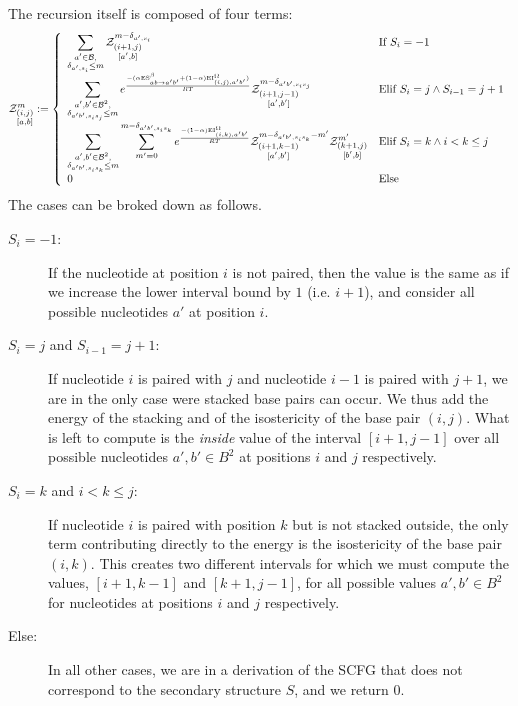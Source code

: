 The recursion itself is composed of four terms:
$$
	\Z{i,j}{m}{a,b}:=\left\{
  \begin{array}{ll}
  		\displaystyle
      \sum_{\substack{a'\in \B,\\ \Kron_{a',s_i}\le m}}  
      \Z{i+1,j}{m-\Kron_{a',s_i}}{a',b} & \text{If }S_{i}=-1\\
      \displaystyle
      \sum_{\substack{a',b'\in \B^2,\\ \Kron_{a'b',s_is_j}\le m}}
			 e^{\frac{-(\alpha \text{ES}^\beta_{a b \to a' b'}+(1-\alpha)\text{EI}^{\Omega}_{(i,j),a'b'})}{RT}}
			 \Z{i+1,j-1}{m-\Kron_{a'b',s_is_j}}{a',b'}&
			 \text{Elif }S_i=j \land S_{i-1}=j+1\\
			 \displaystyle
      \sum_{\substack{a',b'\in \B^2,\\ \Kron_{a'b',s_is_k}\le m}}
      \sum_{m'=0}^{m-\Kron_{a'b',s_is_k}}
   		 e^{\frac{-(1-\alpha)\text{EI}^{\Omega}_{(i,k),a'b'}}{RT}}
      \Z{i+1,k-1}{m-\Kron_{a'b',s_is_k}-m'}{a',b'}
      \Z{k+1,j}{m'}{b',b} & \text{Elif }S_i=k \land i < k \leq j\\
      0 &\text{Else}
	\end{array}\right.
$$
The cases can be broked down as follows.
\begin{description}
\item[$S_{i}=-1$:] If the nucleotide at position $i$ is not paired, then the value is the same
as if we increase the lower interval bound by $1$ (i.e. $i+1$), and consider all possible
 nucleotides $a'$ at position $i$. 
\item[$S_i=j$ and $S_{i-1}=j+1$:] If nucleotide $i$ is paired with $j$ and nucleotide $i-1$ is
paired with $j+1$, we are in the only case were stacked base pairs can occur. We thus add
the energy of the stacking and of the isostericity of the base pair $(i,j)$. What is left
to compute is the \emph{inside} value of the interval $[i+1,j-1]$ over all possible nucleotides 
$a',b'\in B^2$ at positions $i$ and $j$ respectively.
\item[$S_i=k$ and $i<k \leq j$:] If nucleotide $i$ is paired with position $k$ 
but is not stacked outside, the 
only term contributing directly to the energy is the isostericity of the base pair $(i,k)$. This 
creates
two different intervals for which we must compute the values, $[i+1,k-1]$ and $[k+1,j-1]$, for 
all possible values $a',b'\in B^2$ for nucleotides at positions $i$ and $j$ respectively.
\item[Else:] In all other cases, we are in a derivation of the SCFG that does not correspond to the 
secondary structure $S$, and we return $0$.
\end{description}

